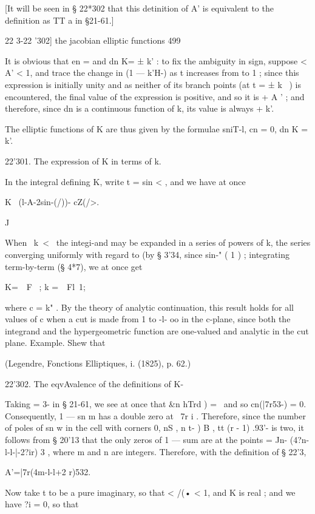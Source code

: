 [It will be seen in § 22*302 that this detinition of A' is equivalent to the definition as 
 TT a  in §21-61.] 



22 3-22 '302] the jacobian elliptic functions 499 

It is obvious that en   = and dn K= ± k' : to fix the ambiguity in sign, 
suppose < A' < 1, and trace the change in (1 — k'H-)  as t increases from to 1 ; 
since this expression is initially unity and as neither of its branch points (at 
t = ± k~ ) is encountered, the final value of the expression is positive, and so 
it is + A ' ; and therefore, since dn   is a continuous function of k, its value is 
always + k'. 

The elliptic functions of K are thus given by the formulae 
sniT-l, cn  = 0, dn K = k'. 

22'301. The expression of K in terms of k. 

In the integral defining K, write t = sin < , and we have at once 

K \ (l-A-2sin-(/))- cZ(/>. 

J 

When \ k\ < \, the integi-and may be expanded in a series of powers of k, 
the series converging uniformly with regard to   (by § 3'34, since sin-" (  1 ) ; 
integrating term-by-term (§ 4*7), we at once get 

K=\ \  F \, ; k =\ \  Fl\,   1; 



where c = k" . By the theory of analytic continuation, this result holds for 
all values of c when a cut is made from 1 to -l- oo in the c-plane, since 
both the integrand and the hypergeometric function are one-valued and 
analytic in the cut plane. 
Example. Shew that 

(Legendre, Fonctions Elliptiques, i. (1825), p. 62.) 

22'302. The eqvAvalence of the definitions of K- 

Taking   =  3- in § 21-61, we see at once that \&n hTrd ) = \ and so cn(|7r53-) = 0. 
Consequently, 1 — sn m has a double zero at \ 7r i . Therefore, since the number of poles 
of sn w in the cell with corners 0,  nS , n  t-  )  B , tt (r - 1) .93'-  is two, it follows from 
§ 20'13 that the only zeros of 1 — sum are at the points   = Jn- (4?n-l-l-|-2?ir)  3 , where 
m and n are integers. Therefore, with the definition of § 22'3, 

A'=|7r(4m-l-l+2 r)532. 

Now take t to be a pure imaginary, so that < /(• < 1, and K is real ; and we have 
?i = 0, so that 

